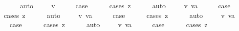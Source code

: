 \begin{isabellebody}
\ \ \ \ \isamarkupfalse%
\ auto\isanewline
{}\isamarkupfalse%
\isanewline
\ \ \isamarkupfalse%
\ {\isacharparenleft}{\isachardoublequoteopen}{}{}{\isacharunderscore}{}{\isachardoublequoteclose}\ v{\isacharparenright}\isanewline
\ \ \isamarkupfalse%
\ \isamarkupfalse%
\ {\isacharquery}case\isanewline
\ \ \ \ \isamarkupfalse%
\ {\isacharparenleft}cases\ z{\isacharparenright}\isanewline
\ \ \ \ \isamarkupfalse%
\ auto\isanewline
{}\isamarkupfalse%
\isanewline
\ \ \isamarkupfalse%
\ {\isacharparenleft}{\isachardoublequoteopen}{}{}{\isacharunderscore}{}{\isachardoublequoteclose}\ v\ va{\isacharparenright}\isanewline
\ \ \isamarkupfalse%
\ \isamarkupfalse%
\ {\isacharquery}case\isanewline
\ \ \ \ \isamarkupfalse%
\ {\isacharparenleft}cases\ z{\isacharparenright}\isanewline
\ \ \ \ \isamarkupfalse%
\ auto\isanewline
{}\isamarkupfalse%
\isanewline
\ \ \isamarkupfalse%
\ {\isacharparenleft}{\isachardoublequoteopen}{}{}{\isacharunderscore}{}{\isachardoublequoteclose}\ v\ va{\isacharparenright}\isanewline
\ \ \isamarkupfalse%
\ \isamarkupfalse%
\ {\isacharquery}case\isanewline
\ \ \ \ \isamarkupfalse%
\ {\isacharparenleft}cases\ z{\isacharparenright}\isanewline
\ \ \ \ \isamarkupfalse%
\ auto\isanewline
{}\isamarkupfalse%
\isanewline
\ \ \isamarkupfalse%
\ {\isacharparenleft}{\isachardoublequoteopen}{}{}{\isacharunderscore}{}{\isachardoublequoteclose}\ v\ va{\isacharparenright}\isanewline
\ \ \isamarkupfalse%
\ \isamarkupfalse%
\ {\isacharquery}case\isanewline
\ \ \ \ \isamarkupfalse%
\ {\isacharparenleft}cases\ z{\isacharparenright}\isanewline
\ \ \ \ \isamarkupfalse%
\ auto\isanewline
{}\isamarkupfalse%
\isanewline
\ \ \isamarkupfalse%
\ {\isacharparenleft}{\isachardoublequoteopen}{}{}{\isacharunderscore}{}{\isachardoublequoteclose}\ v\ va{\isacharparenright}\isanewline
\ \ \isamarkupfalse%
\ \isamarkupfalse%
\ {\isacharquery}case\isanewline
\ \ \ \ \isamarkupfalse%
\ {\isacharparenleft}cases\ z{\isacharparenright}\isanewline

\end{isabellebody}
